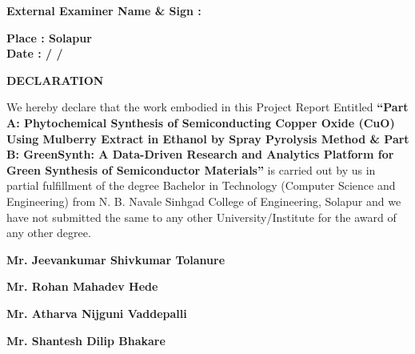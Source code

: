 \documentclass[12pt,a4paper,oneside]{report}
\begin{document}
{{\vspace{1cm}
{\textbf{\hspace*{0.0cm}External Examiner Name \& Sign :}\\
\vspace{1cm}

\vspace{0.2cm}
\begin{flushleft}

{\textbf{Place : Solapur}} \\
\vspace{0.5cm}
{\textbf{Date  : \hspace*{1cm} / \hspace*{1cm}  /    }}
\end{flushleft}








\newpage
\thispagestyle{empty}
\begin{center}
{\large{\textbf{DECLARATION\\}}}
\end{center}
\vspace*{0.5cm}
We hereby declare that the work embodied in this Project Report Entitled \textbf{``Part A: Phytochemical Synthesis of Semiconducting Copper Oxide (CuO) Using Mulberry Extract in Ethanol by Spray Pyrolysis Method \& Part B: GreenSynth: A Data-Driven Research and Analytics Platform for Green Synthesis of Semiconductor Materials''} is carried out by us in partial fulfillment of the degree Bachelor in Technology (Computer Science and Engineering) from N. B. Navale Sinhgad College of Engineering, Solapur and we have not submitted the same to any other University/Institute for the award of any other degree.

\vspace{3cm}
\begin{flushright}
{\textbf{Mr. Jeevankumar Shivkumar Tolanure}}
\end{flushright}
\vspace{0.2cm}
\begin{flushright}
{\textbf{Mr. Rohan Mahadev Hede}}
\end{flushright}
\vspace{0.2cm}
\begin{flushright}
{\textbf{Mr. Atharva Nijguni Vaddepalli}}
\end{flushright}
\vspace{0.2cm}
\begin{flushright}
{\textbf{Mr. Shantesh Dilip Bhakare}}
\end{flushright}



}}}
\end{document}
